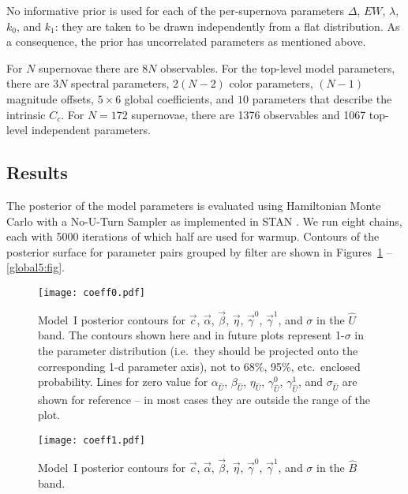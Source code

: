 \documentclass{aastex61}   	%
\begin{document}
No informative prior is used for each of the per-supernova parameters $\Delta$, $EW$, $\lambda$, $k_0$, and $k_1$:
they are taken to be drawn independently from a flat distribution. 
As a consequence, the prior has uncorrelated parameters as mentioned above.  

For $N$ supernovae there are $8N$ observables.  For the top-level model parameters, there are $3N$ spectral parameters, $2(N-2)$
color parameters, $(N-1)$ magnitude offsets,  $5 \times 6$ global coefficients, and $10$ parameters that describe the intrinsic
$C_c$.  For $N=172$ supernovae, there are 1376 observables and 1067 top-level independent parameters.

 
\subsection{Results}
\label{results:sec}
The posterior of the model parameters is evaluated using Hamiltonian Monte Carlo with a No-U-Turn
Sampler as implemented in
STAN \citep{stan}.  We run eight chains, each with 5000 iterations of which
half are used for warmup.
Contours of the posterior surface for parameter pairs grouped by filter are shown in Figures~\ref{global1:fig} -- \ref{global5:fig}.


\begin{figure}[htbp] %
   \centering
   \texttt{[image: coeff0.pdf]} 
            \caption{Model~I posterior contours for $\vec{c}$, $\vec{\alpha}$, $\vec{\beta}$, $\vec{\eta}$, $\vec{\gamma}^0$, $\vec{\gamma}^1$, and $\sigma$ in the ${\hat{U}}$ band.
            The contours shown here and in future plots represent 1-$\sigma$ in the parameter distribution (i.e.\ they should be
            projected onto the corresponding 1-d parameter axis), not to 68\%, 95\%, etc.\
            enclosed probability.  Lines for zero value for $\alpha_{\hat{U}}$, $\beta_{\hat{U}}$, $\eta_{\hat{U}}$, $\gamma_{\hat{U}}^0$, $\gamma_{\hat{U}}^1$, and $\sigma_{\hat{U}}$ are shown for reference --
            in most cases they are outside the range of the plot.
            \label{global1:fig}}
\end{figure}

\begin{figure}[htbp] %
   \centering
   \texttt{[image: coeff1.pdf]} 
            \caption{Model~I posterior contours for $\vec{c}$, $\vec{\alpha}$, $\vec{\beta}$, $\vec{\eta}$,  $\vec{\gamma}^0$, $\vec{\gamma}^1$, and $\sigma$ in the ${\hat{B}}$ band.
 \label{global2:fig}}
\end{figure}
\end{document}
